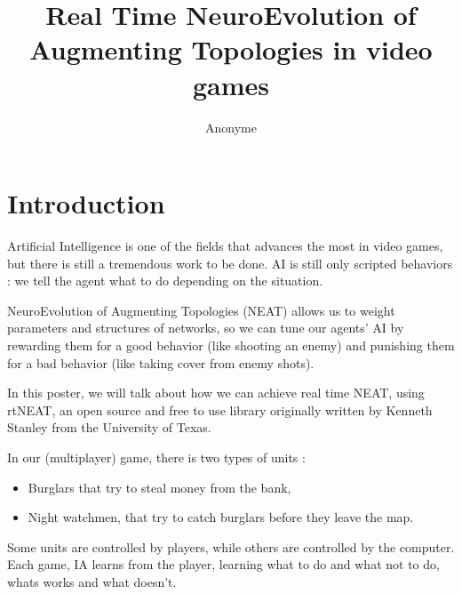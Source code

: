 \documentclass[conference]{acmsiggraph}
\title{Real Time NeuroEvolution of Augmenting Topologies in video games}
\author{Anonyme}
\begin{document}


\maketitle

\section{Introduction}

Artificial Intelligence is one of the fields that advances the most in video games, but there is still a tremendous work to be done. AI is still only scripted behaviors : we tell the agent what to do depending on the situation.

NeuroEvolution of Augmenting Topologies (NEAT) allows us to weight parameters and structures of networks, so we can tune our agents' AI by rewarding them for a good behavior (like shooting an enemy) and punishing them for a bad behavior (like taking cover from enemy shots).

In this poster, we will talk about how we can achieve real time NEAT, using rtNEAT, an open source and free to use library originally written by Kenneth Stanley from the University of Texas.

In our (multiplayer) game, there is two types of units :
\begin{itemize}
	\item Burglars that try to steal money from the bank,
	\item Night watchmen, that try to catch burglars before they leave the map.
\end{itemize}
Some units are controlled by players, while others are controlled by the computer. Each game, IA learns from the player, learning what to do and what not to do, whats works and what doesn't.
\end{document}
